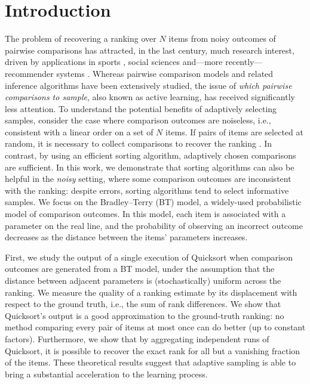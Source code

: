 \section{Introduction}  %
\label{rs:sec:intro}

The problem of recovering a ranking over $N$ items from noisy outcomes of pairwise comparisons has attracted, in the last century, much research interest, driven by applications in sports \citep{elo1978rating}, social sciences \citep{thurstone1927law, salganik2015wiki} and---more recently---recommender systems \citep{houlsby2012collaborative}.
Whereas pairwise comparison models and related inference algorithms have been extensively studied, the issue of \emph{which pairwise comparisons to sample}, also known as active learning, has received significantly less attention.
To understand the potential benefits of adaptively selecting samples, consider the case where comparison outcomes are noiseless, i.e., consistent with a linear order on a set of $N$ items.
If pairs of items are selected at random, it is necessary to collect  comparisons to recover the ranking \citep{alon1994linear}.
In contrast, by using an efficient sorting algorithm,  adaptively chosen comparisons are sufficient.
In this work, we demonstrate that sorting algorithms can also be helpful in the \emph{noisy} setting, where some comparison outcomes are inconsistent with the ranking: despite errors, sorting algorithms tend to select informative samples.
We focus on the Bradley--Terry (BT) model, a widely-used probabilistic model of comparison outcomes.
In this model, each item is associated with a parameter on the real line, and the probability of observing an incorrect outcome decreases as the distance between the items' parameters increases.

First, we study the output of a single execution of Quicksort when comparison outcomes are generated from a BT model, under the assumption that the distance between adjacent parameters is (stochastically) uniform across the ranking.
We measure the quality of a ranking estimate by its displacement with respect to the ground truth, i.e., the sum of rank differences.
We show that Quicksort's output is a good approximation to the ground-truth ranking: no method comparing every pair of items at most once can do better (up to constant factors).
Furthermore, we show that by aggregating  independent runs of Quicksort, it is possible to recover the exact rank for all but a vanishing fraction of the items.
These theoretical results suggest that adaptive sampling is able to bring a substantial acceleration to the learning process.

